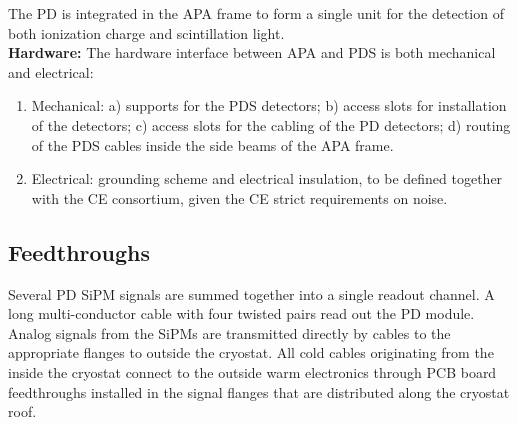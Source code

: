 

The PD is integrated in the APA frame to form a single unit for the detection of both ionization charge and scintillation light.\\

\textbf{Hardware:}
The hardware interface between APA and PDS is both mechanical and electrical: 
\begin{enumerate}
\item Mechanical: a) supports for the PDS detectors; b) access slots for installation of the detectors;
 c) access slots for the cabling of the PD detectors; d) routing of the PDS cables inside the side beams of the APA frame.
\item Electrical: grounding scheme and electrical insulation, to be defined together with the CE consortium, given the CE strict requirements on noise.
\end{enumerate}


\subsection{Feedthroughs}
\label{sec:fdsp-pd-intfc-feed}

Several PD SiPM signals are summed together into a single readout channel. A long multi-conductor cable with four twisted pairs read out the PD module. 
Analog signals from the SiPMs are transmitted directly by cables to the appropriate flanges to outside the cryostat. 
All cold cables originating from the inside the cryostat connect to the outside warm electronics through PCB board feedthroughs installed in the signal flanges that are distributed along the cryostat roof.

